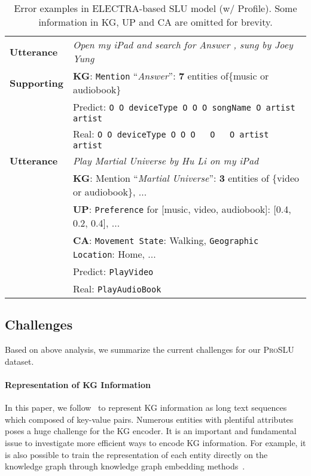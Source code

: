 \documentclass[letterpaper]{article} \usepackage{aaai22}  \usepackage{times}  \usepackage{helvet}  \usepackage{courier}  \usepackage[hyphens]{url}  \usepackage{graphicx} \urlstyle{rm} \def\UrlFont{\rm}  \usepackage{natbib}  \usepackage{caption} \DeclareCaptionStyle{ruled}{labelfont=normalfont,labelsep=colon,strut=off} \frenchspacing  \setlength{\pdfpagewidth}{8.5in}  \setlength{\pdfpageheight}{11in}  \usepackage{algorithm}
\begin{document}
\begin{table}[t]
	\centering
	\begin{adjustbox}{width=0.48\textwidth}
		\begin{tabular}{l|l}
			\hline \hline 
			\textbf{Utterance} & \textit{Open my iPad and search for Answer , sung by Joey Yung} \\ 
			\hdashline
			\textbf{Supporting} & \textbf{KG}: \texttt{Mention} ``\textit{Answer}'': \textbf{7} entities of\{music or audiobook\} \\
			\hdashline
			\multirow{2}{*}{\textbf{Slot}} 
			& Predict:	\texttt{O O deviceType O O O songName O artist artist} \\
			& Real:	\texttt{\quad O O deviceType O O O \quad \ \  O \quad \ \  O artist artist} \\
			\hline 
			\hline 
			\textbf{Utterance} & \textit{Play Martial Universe by Hu Li on my iPad} \\ 
			\hdashline
			\multirow{3}{*}{\textbf{Supporting}} 
			& \textbf{KG}: Mention ``\textit{Martial Universe}'': \textbf{3} entities of \{video or audiobook\}, ...\\ 
			& \textbf{UP}: \texttt{Preference} for [music, video, audiobook]: {[}0.4, 0.2, 0.4{]},  ... \\
			& \textbf{CA}: \texttt{Movement State}: Walking, \texttt{Geographic Location}: Home, ... \\ 			
			\hdashline
			\multirow{2}{*}{\textbf{Intent}} 
			& Predict: \texttt{PlayVideo} \\
			& Real: \texttt{\quad PlayAudioBook} \\
			\hline \hline 
		\end{tabular}
	\end{adjustbox}
	\caption{
		Error examples in ELECTRA-based SLU model (w/ Profile). 
		Some information in KG, UP and CA are omitted for brevity.
	}
	\label{tab:error-analysis}
\end{table}

\subsection{Challenges}
Based on above analysis, we summarize the current challenges for our \textsc{ProSLU} dataset.
\paragraph{Representation of KG Information}
In this paper, we follow~\citet{Chen2020TabFact} to represent KG information as long text sequences which composed of key-value pairs. 
Numerous entities with plentiful attributes poses a huge challenge for the KG encoder. 
It is an important and fundamental issue to investigate more efficient ways to encode KG information.
For example, it is also possible to train the representation of each entity directly on the knowledge graph through knowledge graph embedding methods~\citep{NIPS2013_1cecc7a7}.
\end{document}
